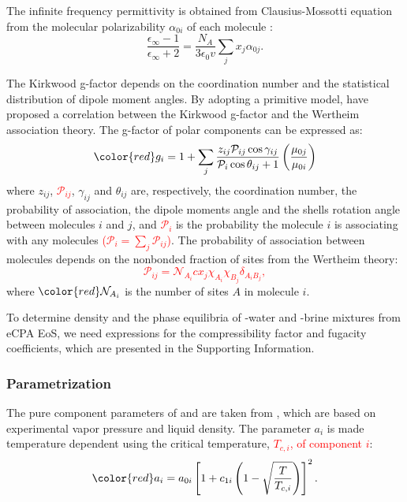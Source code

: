 The infinite frequency permittivity is obtained from Clausius-Mossotti equation from the molecular polarizability $\alpha_{0i}$ of each molecule \cite{Scaife1989}:
\begin{equation}
     \frac{\epsilon_\infty-1}{\epsilon_\infty+2}=\frac{N_A}{3\epsilon_0v}\sum_jx_j\alpha_{0j}.
        \label{Eq:eps_infty}
\end{equation} 

The Kirkwood g-factor depends on the coordination number and the statistical distribution of dipole moment angles. By adopting a primitive model, \citeauthor{Maribo2013a} \cite{Maribo2013a} have proposed a correlation between the Kirkwood g-factor and the Wertheim association theory. The g-factor of polar components can be expressed as: 
\begin{equation}
        \color{red}
        g_i = 1 + \sum_j \frac{z_{ij}\mathcal{P}_{ij}\cos{\gamma_{ij}}}{\mathcal{P}_i \cos{\theta_{ij}+1}}\left ( \frac{\mu_{0j}}{\mu_{0i}} \right )
        \label{Eq:Kirkwood}
\end{equation} 
where $z_{ij}$, \textcolor{red}{ $\mathcal{P}_{ij}$}, $\gamma_{ij}$ and $\theta_{ij}$ are, respectively, the coordination number, the probability of association, the dipole moments angle and the shells rotation angle between molecules $i$ and $j$, and \textcolor{red}{ $\mathcal{P}_{i}$} is the probability the molecule $i$ is associating with any molecules \textcolor{red}{ ($\mathcal{P}_{i} = \sum\limits_j \mathcal{P}_{ij}$)}. The probability of association between molecules depends on the nonbonded fraction of sites from the Wertheim theory:
\textcolor{red}{
\begin{equation}
        \mathcal{P}_{ij} = \mathcal{N}_{A_i} c x_j\chi_{A_i} \chi_{B_j} \delta_{A_iB_j},
        \label{Eq:P_ij}
\end{equation} 
}
where $\color{red}\mathcal{N}_{A_i}$ is the number of sites $A$ in molecule $i$.

To determine density and the phase equilibria of -water and -brine mixtures from eCPA EoS, we need expressions for the compressibility factor and fugacity coefficients, which are presented in the Supporting Information.

\subsubsection{Parametrization}
The pure component parameters of  and  are taken from \citeauthor{Tsivintzelis2011} \cite{Tsivintzelis2011}, which are based on experimental vapor pressure and liquid density. The parameter $a_i$ is made temperature dependent using the critical temperature, \textcolor{red}{$T_{c,i}$, of component $i$}:
\begin{equation}
    \color{red}
    a_i = a_{0i}\left [ 1+ c_{1i} \left ( 1-\sqrt{\frac{T}{T_{c,i}}} \right )\right ]^2.
    \label{Eq:CPA_ai}
\end{equation}

